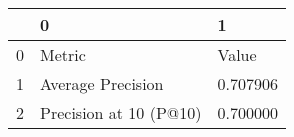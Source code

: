 \begin{tabular}{lll}
\toprule
 & 0 & 1 \\
\midrule
0 & Metric & Value \\
1 & Average Precision & 0.707906 \\
2 & Precision at 10 (P@10) & 0.700000 \\
\bottomrule
\end{tabular}
